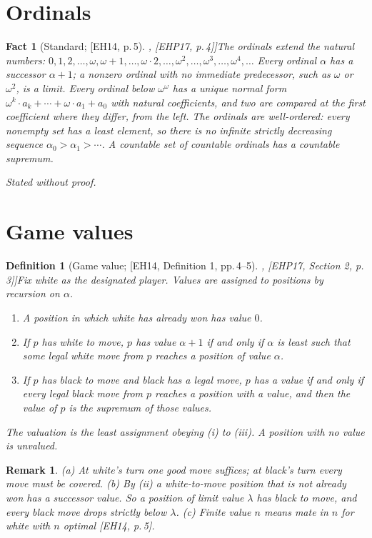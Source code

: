 \documentclass[10pt]{article}
\theoremstyle{notes}
\newtheorem{definition}[theorem]{Definition}
\newtheorem{fact}[theorem]{Fact}
\newtheorem{remark}[theorem]{Remark}
\newcommand{\stated}{\par\noindent\emph{Stated without proof.}\par}
\newcommand{\EH}[1]{[EH14, #1]}
\newcommand{\EHP}[1]{[EHP17, #1]}
\begin{document}
\section{Ordinals}

\begin{fact}[Standard; \EH{p.\,5}, \EHP{p.\,4}]\label{fact:ordinals}
The ordinals extend the natural numbers:
$0,1,2,\ldots,\omega,\omega+1,\ldots,\omega\cdot 2,\ldots,\omega^2,\ldots,\omega^3,\ldots,\omega^4,\ldots$
Every ordinal $\alpha$ has a successor $\alpha+1$; a nonzero ordinal with no immediate predecessor, such as
$\omega$ or $\omega^2$, is a \emph{limit}. Every ordinal below $\omega^\omega$ has a unique normal form
$\omega^k\cdot a_k+\cdots+\omega\cdot a_1+a_0$ with natural coefficients, and two are compared at the first
coefficient where they differ, from the left. The ordinals are \emph{well-ordered}: every nonempty set has a
least element, so there is no infinite strictly decreasing sequence $\alpha_0>\alpha_1>\cdots$. A countable
set of countable ordinals has a countable supremum.
\stated
\end{fact}

\section{Game values}

\begin{definition}[Game value; \EH{Definition 1, pp.\,4--5}, \EHP{Section 2, p.\,3}]\label{def:value}
Fix white as the designated player. Values are assigned to positions by recursion on $\alpha$.
\begin{enumerate}[label=(\roman*)]
  \item A position in which white has already won has value $0$.
  \item If $p$ has white to move, $p$ has value $\alpha+1$ if and only if $\alpha$ is least such that some
    legal white move from $p$ reaches a position of value $\alpha$.
  \item If $p$ has black to move and black has a legal move, $p$ has a value if and only if every legal black
    move from $p$ reaches a position with a value, and then the value of $p$ is the supremum of those values.
\end{enumerate}
The valuation is the least assignment obeying (i) to (iii). A position with no value is \emph{unvalued}.
\end{definition}

\begin{remark}\label{rem:value}
(a) At white's turn one good move suffices; at black's turn every move must be covered.
(b) By (ii) a white-to-move position that is not already won has a successor value. So a position of limit value $\lambda$ has black
to move, and every black move drops strictly below $\lambda$.
(c) Finite value $n$ means mate in $n$ for white with $n$ optimal \EH{p.\,5}.
\end{remark}
\end{document}
